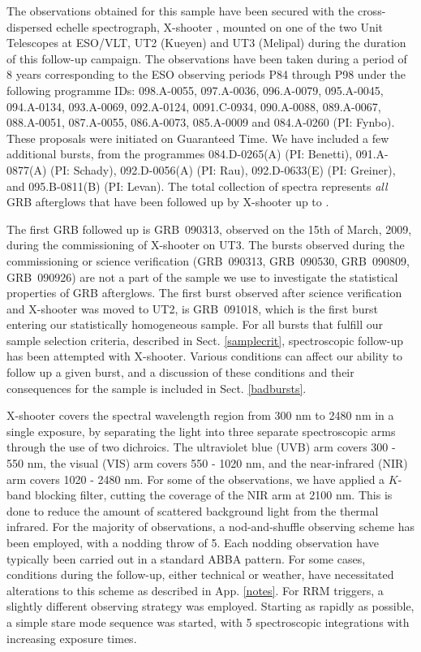 \documentclass{aa}    %
\begin{document}
The observations obtained for this sample have been secured with the
cross-dispersed echelle spectrograph, X-shooter \citep{Vernet2011}, mounted on
one of the two Unit Telescopes at ESO/VLT, UT2 (Kueyen) and UT3 (Melipal) during
the duration of this follow-up campaign. The observations have been taken during
a period of 8 years corresponding to the ESO observing periods P84 through P98
under the following programme IDs: 098.A-0055, 097.A-0036, 096.A-0079,
095.A-0045, 094.A-0134, 093.A-0069, 092.A-0124, 0091.C-0934, 090.A-0088,
089.A-0067, 088.A-0051, 087.A-0055, 086.A-0073, 085.A-0009 and 084.A-0260 (PI:
Fynbo). These proposals were initiated on Guaranteed Time. We have included a
few additional bursts, from the programmes 084.D-0265(A) (PI: Benetti),
091.A-0877(A) (PI: Schady), 092.D-0056(A) (PI: Rau), 092.D-0633(E) (PI:
Greiner), and 095.B-0811(B) (PI: Levan). The total collection of spectra
represents \textit{all} GRB afterglows that have been followed up by X-shooter
up to \termdate.

The first GRB followed up is GRB~090313, observed on the 15th of March, 2009,
during the commissioning of X-shooter on UT3. The bursts observed during the
commissioning or science verification (GRB~090313, GRB~090530, GRB~090809,
GRB~090926) are not a part of the sample we use to investigate the statistical
properties of GRB afterglows. The first burst observed after science
verification and X-shooter was moved to UT2, is GRB~091018, which is the first
burst entering our statistically homogeneous sample. For all bursts that fulfill
our sample selection criteria, described in Sect. \ref{samplecrit},
spectroscopic follow-up has been attempted with X-shooter. Various conditions
can affect our ability to follow up a given burst, and a discussion of these
conditions and their consequences for the sample is included in Sect.
\ref{badbursts}.

X-shooter covers the spectral wavelength region from 300 nm to 2480 nm in a
single exposure, by separating the light into three separate spectroscopic arms
through the use of two dichroics. The ultraviolet blue (UVB) arm covers 300 -
550 nm, the visual (VIS) arm covers 550 - 1020 nm, and the near-infrared (NIR)
arm covers 1020 - 2480 nm. For some of the observations, we have applied a
$K$-band blocking filter, cutting the coverage of the NIR arm at 2100 nm. This
is done to reduce the amount of scattered background light from the thermal
infrared. For the majority of observations, a nod-and-shuffle observing scheme
has been employed, with a nodding throw of 5\arcsec. Each nodding observation
have typically been carried out in a standard ABBA pattern. For some cases,
conditions during the follow-up, either technical or weather, have necessitated
alterations to this scheme as described in App. \ref{notes}. For RRM triggers, a
slightly different observing strategy was employed. Starting as rapidly as
possible, a simple stare mode sequence was started, with 5 spectroscopic
integrations with increasing exposure times. 
\end{document}
